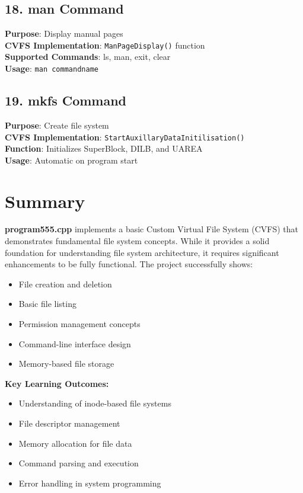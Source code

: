 \documentclass[11pt,a4paper]{article}
\begin{document}
\subsection{18. man Command}
\textbf{Purpose}: Display manual pages\\
\textbf{CVFS Implementation}: \texttt{ManPageDisplay()} function\\
\textbf{Supported Commands}: ls, man, exit, clear\\
\textbf{Usage}: \texttt{man commandname}

\subsection{19. mkfs Command}
\textbf{Purpose}: Create file system\\
\textbf{CVFS Implementation}: \texttt{StartAuxillaryDataInitilisation()}\\
\textbf{Function}: Initializes SuperBlock, DILB, and UAREA\\
\textbf{Usage}: Automatic on program start

\section{Summary}

\textbf{program555.cpp} implements a basic Custom Virtual File System (CVFS) that demonstrates fundamental file system concepts. While it provides a solid foundation for understanding file system architecture, it requires significant enhancements to be fully functional. The project successfully shows:

\begin{itemize}
    \item File creation and deletion
    \item Basic file listing
    \item Permission management concepts
    \item Command-line interface design
    \item Memory-based file storage
\end{itemize}

\textbf{Key Learning Outcomes:}
\begin{itemize}
    \item Understanding of inode-based file systems
    \item File descriptor management
    \item Memory allocation for file data
    \item Command parsing and execution
    \item Error handling in system programming
\end{itemize}
\end{document}
